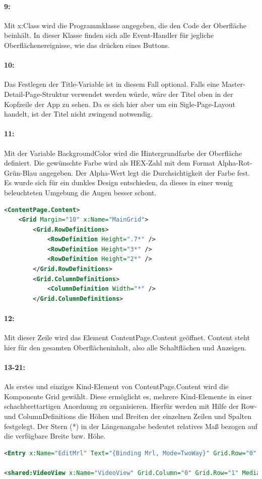 \paragraph{9:} Mit x:Class wird die Programmklasse angegeben, die den Code der Oberfläche beinhält. In dieser Klasse finden sich alle Event-Handler für jegliche Oberflächenereignisse, wie das drücken eines Buttons.
\paragraph{10:} Das Festlegen der Title-Variable ist in diesem Fall optional. Falls eine Master-Detail-Page-Struktur verwendet werden würde, wäre der Titel oben in der Kopfzeile der App zu sehen. Da es sich hier aber um ein Sigle-Page-Layout handelt, ist der Titel nicht zwingend notwendig.
\paragraph{11:} Mit der Variable BackgroundColor wird die Hintergrundfarbe der Oberfläche definiert. Die gewünschte Farbe wird als HEX-Zahl mit dem Format Alpha-Rot-Grün-Blau angegeben. Der Alpha-Wert legt die Durchsichtigkeit der Farbe fest. Es wurde sich für ein dunkles Design entschieden, da dieses in einer wenig beleuchteten Umgebung die Augen besser schont.

\begin{lstlisting}[firstnumber=12,language=xml]
<ContentPage.Content>
    <Grid Margin="10" x:Name="MainGrid">
        <Grid.RowDefinitions>
            <RowDefinition Height=".7*" />
            <RowDefinition Height="3*" />
            <RowDefinition Height="2*" />
        </Grid.RowDefinitions>
        <Grid.ColumnDefinitions>
            <ColumnDefinition Width="*" />
        </Grid.ColumnDefinitions>
\end{lstlisting}
\paragraph{12:} Mit dieser Zeile wird das Element ContentPage.Content geöffnet. Content steht hier für den gesamten Oberflächeninhalt, also alle Schaltflächen und Anzeigen.
\paragraph{13-21:} Als erstes und einziges Kind-Element von ContentPage.Content wird die Komponente Grid gewählt. Diese ermöglicht es, mehrere Kind-Elemente in einer schachbrettartigen Anordnung zu organisieren. Hierfür werden mit Hilfe der Row- und ColumnDefinitions die Höhen und Breiten der einzelnen Zeilen und Spalten festgelegt. Der Stern (*) in der Längenangabe bedeutet relatives Maß bezogen auf die verfügbare Breite bzw. Höhe.
\begin{lstlisting}[firstnumber=23,language=xml]
<Entry x:Name="EditMrl" Text="{Binding Mrl, Mode=TwoWay}" Grid.Row="0" Grid.Column="0" TextColor="White" />

<shared:VideoView x:Name="VideoView" Grid.Column="0" Grid.Row="1" MediaPlayer="{Binding MediaPlayer}"/>
\end{lstlisting}

